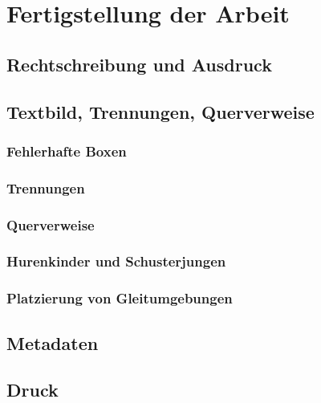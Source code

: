 \documentclass[twoside,a4paper,11pt,openright]{report}
\begin{document}
\chapter{Fertigstellung der Arbeit}
\label{sec:final}

\section{Rechtschreibung und Ausdruck}




\section{Textbild, Trennungen, Querverweise}


\subsection{Fehlerhafte Boxen}


\subsection{Trennungen}

\subsection{Querverweise}

\subsection{Hurenkinder und Schusterjungen}


\subsection{Platzierung von Gleitumgebungen}
\label{sec:final:float}


\section{Metadaten}


\section{Druck}
\end{document}
